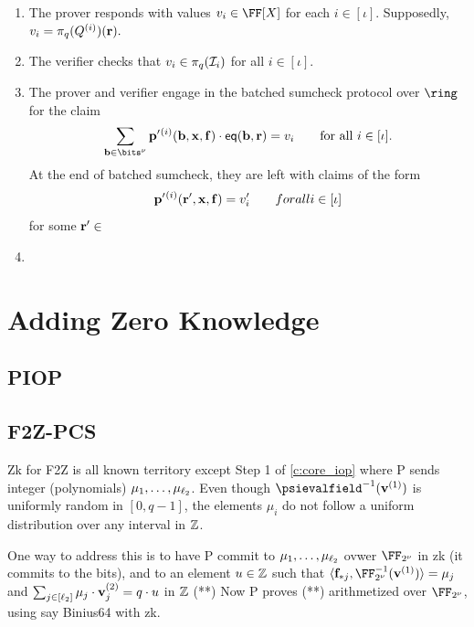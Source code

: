 \documentclass[11pt,letterpaper,usenames,dvipsnames]{article}
\begin{document}
\begin{construction}
\begin{enumerate}[leftmargin=*]
\item The prover responds with values $v_i\in \FF[X]$ for each $i\in [\iota]$. Supposedly, 
%
$
v_i = \pi_q(Q^{(i)})(\mathbf{r}).
$
\item The verifier checks that $v_i \in \pi_q(\mathcal{I}_i)$ for all $i\in [\iota]$.
\item The prover and verifier engage in the batched sumcheck protocol over $\ring$ for the claim 
$$
\sum_{\bb\in \bits^\nu}\pp'{}^{(i)}(\bb,\xx,\bff) \cdot \eq(\bb, \rr) = v_i \qquad \text{for all } i\in [\iota].
$$
%
At the end of  batched sumcheck, they are left with claims of the form
%
$$
\mathbf{p}'{}^{(i)}(\mathbf{r}', \mathbf{x},\mathbf{f}) = v_i' \qquad {for all } i \in [\iota]
$$
for some $\mathbf{r}' \in $
%
\item 
\end{enumerate}
    
\end{construction}


\section{Adding Zero Knowledge}

\subsection{PIOP}

\subsection{F2Z-PCS}
 Zk for F2Z is all known territory except Step 1 of \cref{c:core_iop} where P sends integer (polynomials) $\mu_1,\ldots, \mu_{\ell_2}$. Even though  $\psievalfield^{-1}(\vv^{(1)})$ is uniformly random in $[0,q-1]$, the elements $\mu_i$ do not follow a uniform distribution over any interval in $\mathbb{Z}$.

One way to address this is to have P commit to $\mu_1, \ldots, \mu_{\ell_2}$ ovwer $\comfield$ in zk (it commits to the bits), and to an element $u\in \mathbb{Z}$ such that $\langle \bff_{*j}, \comfield^{-1}(\vv^{(1)})\rangle = \mu_j$ and $\sum_{j\in[\ell_2]} \mu_j \cdot \mathbf{v}_j^{(2)} =  q\cdot u$ in $\mathbb{Z}$ (**)  Now P proves (**) arithmetized over $\comfield$, using say Binius64 with zk. 
\end{document}
